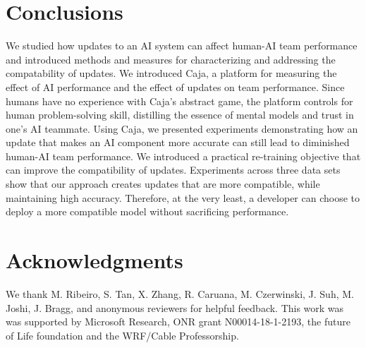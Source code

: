 \documentclass[letterpaper]{article} %
\newcommand{\?}{\mbox{?}}
\newcommand{\plat}{{\sc Caja}}
\begin{document}
\section{Conclusions}
    We studied how updates to an AI system can affect human-AI team performance and introduced methods and measures for characterizing and addressing the compatability of updates. We introduced \plat, a platform for measuring the effect of AI performance and the effect of updates on team performance. Since humans have no experience with \plat's abstract game, the platform controls for human problem-solving skill, distilling the essence of mental models and trust in one's AI teammate.
    Using \plat, we presented experiments  demonstrating how an update that makes an AI component more accurate can still lead to diminished human-AI team performance. %
    We introduced a practical re-training objective that can improve the compatibility of updates. 
    Experiments across three data sets show that our  approach creates updates that are more compatible, while maintaining high accuracy. 
    Therefore, at the very least, a developer can choose to deploy a more compatible model without sacrificing performance. 
    
    

\section{Acknowledgments}
We thank  M.  Ribeiro,  S.  Tan,  X.
Zhang,  R.  Caruana,  M.  Czerwinski,  J.  Suh,  M.  Joshi,  J.
Bragg, and anonymous reviewers for helpful feedback. This work was
was supported by Microsoft Research, ONR grant N00014-18-1-2193, the future of Life foundation and the WRF/Cable Professorship.


\end{document}
